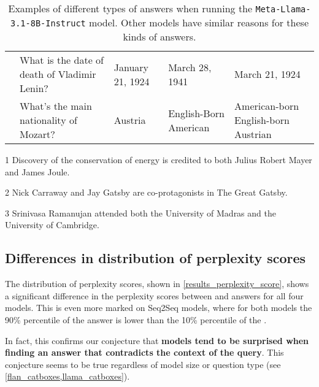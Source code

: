 \begin{table}[p]
\begin{threeparttable}
\begin{tabularx}{\textwidth}{>{\bfseries}c>{\ttfamily}X >{\ttfamily}p{75pt} >{\ttfamily}p{75pt} >{\ttfamily}p{75pt}}
			\multirow[t]{2}{*}{7.} & What is the date of death of Vladimir Lenin? & January 21, 1924 & March 28, 1941 & March 21, 1924 \\
				& What's the main nationality of Mozart? & Austria & English-Born American & American-born English-born Austrian \\
			\bottomrule
		\end{tabularx}
		\begin{tablenotes}
\item[1] Discovery of the conservation of energy is credited to both Julius Robert Mayer and James Joule.
\item[2] Nick Carraway and Jay Gatsby are co-protagonists in The Great Gatsby.
\item[3] Srinivasa Ramanujan attended both the University of Madras and the University of Cambridge.
		\end{tablenotes}
	\end{threeparttable}
	\caption{Examples of different types of \Other{} answers when running the \texttt{Meta-Llama-3.1-8B-Instruct} model. Other models have similar reasons for these kinds of answers.}
	\label{other_examples}
\end{table}

\subsection{Differences in distribution of perplexity scores}

The distribution of perplexity scores, shown in \cref{results_perplexity_score}, shows a significant difference in the perplexity scores between \Parametric{} and \Contextual{} answers for all four models.
This is even more marked on Seq2Seq models, where for both models the 90\% percentile of the \Contextual{} answer is lower than the 10\% percentile of the \Parametric{}.

In fact, this confirms our conjecture that \textbf{models tend to be surprised when finding an answer that contradicts the context of the query}.
This conjecture seems to be true regardless of model size or question type (see \cref{flan_catboxes,llama_catboxes}).

